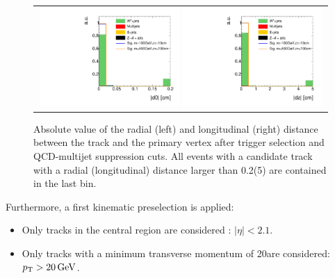 \begin{figure}[!t]
  \centering 
  \begin{tabular}{c}
    \includegraphics[width=0.49\textwidth]{figures/analysis_2/AnalysisSelection/chiTracksQCDsupressionTrigger_2Signals_FullBkg/htrackd0_lin.pdf}
    \includegraphics[width=0.49\textwidth]{figures/analysis_2/AnalysisSelection/chiTracksQCDsupressionTrigger_2Signals_FullBkg/htrackdz_lin.pdf}
  \end{tabular}
  \caption{Absolute value of the radial (left) and longitudinal (right) distance between the track and the primary vertex after trigger selection and QCD-multijet suppression cuts. 
           All events with a candidate track with a radial (longitudinal) distance larger than 0.2\cm (5\cm) are contained in the last bin.}
  \label{fig:d0_dz}
\end{figure}

Furthermore, a first kinematic preselection is applied:
\begin{itemize}
\renewcommand{\labelitemi}{\footnotesize{\ding{118}}}
\item Only tracks in the central region are considered : $|\eta|<2.1$.
\item Only tracks with a minimum transverse momentum of 20\gev are considered:\\
       \mbox{$p_{\text{T}}>20\,\text{Ge}\kern-0.06667em\text{V}$}.\\
\end{itemize}

